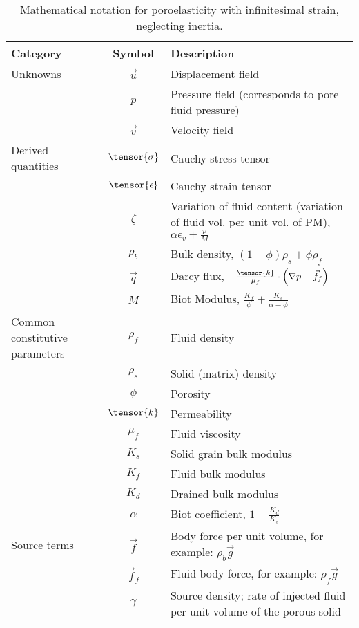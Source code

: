 \begin{table}[htbp]
  \caption{Mathematical notation for poroelasticity with
    infinitesimal strain, neglecting inertia.}
  \label{tab:notation:poroelasticity}
  \begin{tabular}{lcp{3.5in}}
    \toprule
    {\bf Category} & {\bf Symbol} & {\bf Description} \\
    \midrule
    Unknowns           & $\vec{u}$ & Displacement field \\
                       & $p$       & Pressure field (corresponds to pore fluid pressure) \\
                       & $\vec{v}$ & Velocity field \\
    \hline
    Derived quantities & $\tensor{\sigma}$ & Cauchy stress tensor \\
                       & $\tensor{\epsilon}$ & Cauchy strain tensor \\
                       & $\zeta$ & Variation of fluid content (variation of fluid vol. per unit vol. of PM), $\alpha \epsilon_{v} + \frac{p}{M}$ \\
                       & $\rho_{b}$ & Bulk density, $\left(1 - \phi\right) \rho_{s} + \phi \rho_{f}$ \\
                       & $\vec{q}$ & Darcy flux, $-\frac{\tensor{k}}{\mu_{f}} \cdot \left(\nabla p - \vec{f}_{f}\right)$ \\
                       & $M$ & Biot Modulus, $\frac{K_{f}}{\phi} + \frac{K_{s}}{\alpha - \phi}$ \\
    \hline
    Common constitutive parameters & $\rho_{f}$ & Fluid density \\
                       & $\rho_{s}$ & Solid (matrix) density \\
                       & $\phi$ & Porosity \\
                       & $\tensor{k}$ & Permeability \\
                       & $\mu_{f}$ & Fluid viscosity \\
                       & $K_{s}$ & Solid grain bulk modulus \\
                       & $K_{f}$ & Fluid bulk modulus \\
                       & $K_{d}$ & Drained bulk modulus \\
                       & $\alpha$ & Biot coefficient, $1 - \frac{K_{d}}{K_{s}}$ \\
    \hline
    Source terms       & $\vec{f}$ & Body force per unit volume, for example: $\rho_{b} \vec{g}$ \\
                       & $\vec{f}_{f}$ & Fluid body force, for example: $\rho_{f} \vec{g}$ \\
                       & $\gamma$ & Source density; rate of injected fluid per unit volume of the porous solid \\
    \bottomrule
  \end{tabular}
\end{table}\\

